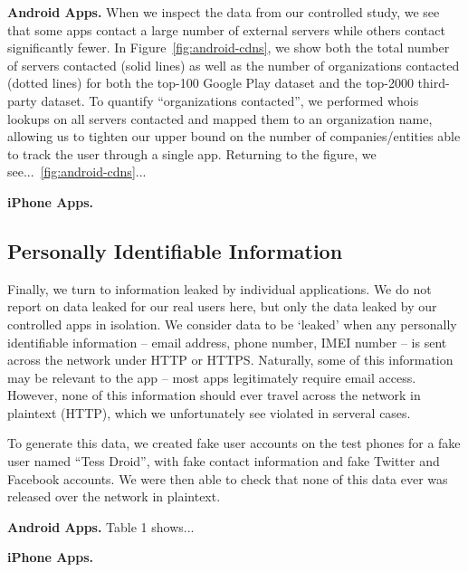   {\bf Android Apps.}
  When we inspect the data from our controlled study, we see that some apps contact a large number of external servers while others contact significantly fewer.
  In Figure~\ref{fig:android-cdns}, we show both the total number of servers contacted (solid lines) as well as the number of organizations contacted (dotted lines) for both the top-100 Google Play dataset and the top-2000 third-party dataset.
  To quantify ``organizations contacted'', we performed whois lookups on all servers contacted and mapped them to an organization name, allowing us to tighten our upper bound on the number of companies/entities able to track the user through a single app.
  Returning to the figure, we see...~\ref{fig:android-cdns}...


  {\bf iPhone Apps.}

\subsection{Personally Identifiable Information}
  Finally, we turn to information leaked by individual applications. We do not report on data leaked for our real users here, but only the data leaked by our controlled apps in isolation.
  We consider data to be `leaked' when any personally identifiable information -- email address, phone number, IMEI number -- is sent across the network under HTTP or HTTPS.
  Naturally, some of this information may be relevant to the app -- most apps legitimately require email access. 
  However, none of this information should ever travel across the network in plaintext (HTTP), which we unfortunately see violated in serveral cases.

  To generate this data, we created fake user accounts on the test phones for a fake user named ``Tess Droid'', with fake contact information and fake Twitter and Facebook accounts. We were then able to check that none of this data ever was released over the network in plaintext.

  {\bf Android Apps.}
  Table 1 shows...

  {\bf iPhone Apps.}






